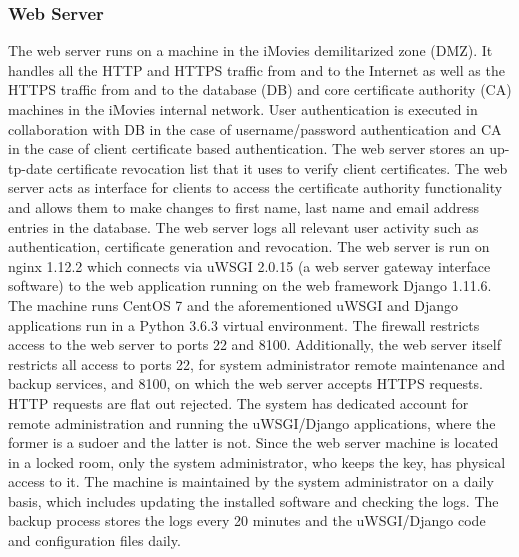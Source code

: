 \documentclass[english]{article}
\begin{document}
\subsubsection{Web Server}
The web server runs on a machine in the iMovies demilitarized zone (DMZ). It handles all the HTTP and HTTPS traffic from and to the Internet as well as the HTTPS traffic from and to
the database (DB) and core certificate authority (CA) machines in the iMovies internal network. User authentication is executed in collaboration with DB in the case of username/password authentication
and CA in the case of client certificate based authentication. The web server stores an up-tp-date certificate revocation list that it uses to verify client certificates. 
The web server acts as interface for clients to access the certificate authority functionality and allows them to make changes to first name, last name and email address entries in the database. The web server logs all relevant
user activity such as authentication, certificate generation and revocation. The web server is run on nginx 1.12.2 which connects via uWSGI 2.0.15 (a web server gateway interface software) to the web application running
on the web framework Django 1.11.6. The machine runs CentOS 7 and the aforementioned uWSGI and Django applications run in a Python 3.6.3 virtual environment. The firewall restricts access to the web server to ports 22 and 8100.
Additionally, the web server itself restricts all access to ports 22, for system administrator remote maintenance and backup services, and 8100, on which the web server accepts HTTPS requests. HTTP requests are flat out rejected.
The system has dedicated account for remote administration and running the uWSGI/Django applications, where the former is a sudoer and the latter is not. Since the web server machine is located in a locked room, only the system
administrator, who keeps the key, has physical access to it. The machine is maintained by the system administrator on a daily basis, which includes updating the installed software and checking the logs. The backup process stores the logs
every 20 minutes and the uWSGI/Django code and configuration files daily.
\end{document}
